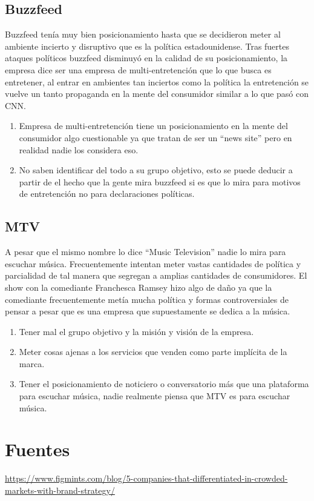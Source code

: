 \documentclass{article}
\begin{document}
\subsection{Buzzfeed}
Buzzfeed tenía muy bien posicionamiento hasta que se decidieron meter al ambiente incierto y disruptivo que es la política estadounidense. Tras fuertes ataques políticos buzzfeed disminuyó en la calidad de su posicionamiento, la empresa dice ser una empresa de multi-entretención que lo que busca es entretener, al entrar en ambientes tan inciertos como la política la entretención se vuelve un tanto propaganda en la mente del consumidor similar a lo que pasó con CNN.
\begin{enumerate}
    \item Empresa de multi-entretención tiene un posicionamiento en la mente del consumidor algo cuestionable ya que tratan de ser un ``news site'' pero en realidad nadie los considera eso.
    \item No saben identificar del todo a su grupo objetivo, esto se puede deducir a partir de el hecho que la gente mira buzzfeed si es que lo mira para motivos de entretención no para declaraciones políticas.
\end{enumerate} 


\subsection{MTV}
A pesar que el mismo nombre lo dice ``Music Television'' nadie lo mira para escuchar música. Frecuentemente intentan meter vastas cantidades de política y parcialidad de tal manera que segregan a amplias cantidades de consumidores. El show con la comediante Franchesca Ramsey hizo algo de daño ya que la comediante frecuentemente metía mucha política y formas controversiales de pensar a pesar que es una empresa que supuestamente se dedica a la música.
\begin{enumerate}
    \item Tener mal el grupo objetivo y la misión y visión de la empresa.
    \item Meter cosas ajenas a los servicios que venden como parte implícita de la marca.
    \item Tener el posicionamiento de noticiero o conversatorio más que una plataforma para escuchar música, nadie realmente piensa que MTV es para escuchar música.
\end{enumerate}


\section{Fuentes}
\begin{enumerate}[label={[\arabic*]}]
    \item \url{https://www.figmints.com/blog/5-companies-that-differentiated-in-crowded-markets-with-brand-strategy/}
\end{enumerate}
\end{document}

